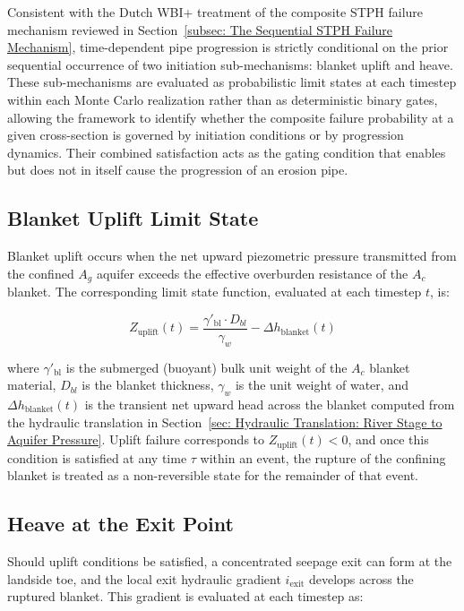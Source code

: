 Consistent with the Dutch WBI+ treatment of the composite STPH failure mechanism reviewed in Section~\ref{subsec: The Sequential STPH Failure Mechanism}, time-dependent pipe progression is strictly conditional on the prior sequential occurrence of two initiation sub-mechanisms: blanket uplift and heave. These sub-mechanisms are evaluated as probabilistic limit states at each timestep within each Monte Carlo realization rather than as deterministic binary gates, allowing the framework to identify whether the composite failure probability at a given cross-section is governed by initiation conditions or by progression dynamics. Their combined satisfaction acts as the gating condition that enables but does not in itself cause the progression of an erosion pipe.

\subsection{Blanket Uplift Limit State}
\label{subsec: Blanket Uplift Limit State}

Blanket uplift occurs when the net upward piezometric pressure transmitted from the confined $A_g$ aquifer exceeds the effective overburden resistance of the $A_c$ blanket. The corresponding limit state function, evaluated at each timestep $t$, is:

$$Z_\mathrm{uplift}(t) = \frac{\gamma'_\mathrm{bl} \cdot D_{bl}}{\gamma_w} - \Delta h_\mathrm{blanket}(t)$$

where $\gamma'_\mathrm{bl}$ is the submerged (buoyant) bulk unit weight of the $A_c$ blanket material, $D_{bl}$ is the blanket thickness, $\gamma_w$ is the unit weight of water, and $\Delta h_\mathrm{blanket}(t)$ is the transient net upward head across the blanket computed from the hydraulic translation in Section~\ref{sec: Hydraulic Translation: River Stage to Aquifer Pressure}. Uplift failure corresponds to $Z_\mathrm{uplift}(t) < 0$, and once this condition is satisfied at any time $\tau$ within an event, the rupture of the confining blanket is treated as a non-reversible state for the remainder of that event.

\subsection{Heave at the Exit Point}
\label{subsec: Heave at the Exit Point}

Should uplift conditions be satisfied, a concentrated seepage exit can form at the landside toe, and the local exit hydraulic gradient $i_\mathrm{exit}$ develops across the ruptured blanket. This gradient is evaluated at each timestep as:

